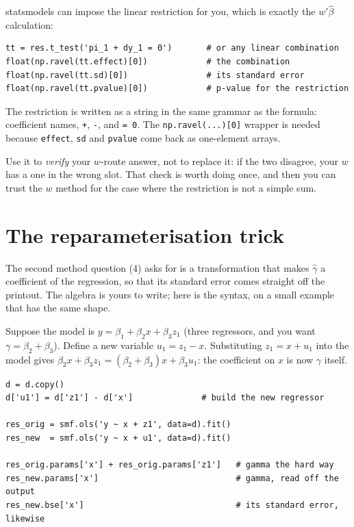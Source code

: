 \documentclass[11pt]{article}
\newcommand{\code}[1]{\texttt{#1}}
\begin{document}
statsmodels can impose the linear restriction for you, which is exactly the
$w'\hat\beta$ calculation:

\begin{lstlisting}
tt = res.t_test('pi_1 + dy_1 = 0')       # or any linear combination
float(np.ravel(tt.effect)[0])            # the combination
float(np.ravel(tt.sd)[0])                # its standard error
float(np.ravel(tt.pvalue)[0])            # p-value for the restriction
\end{lstlisting}

\noindent The restriction is written as a string in the same grammar as the
formula: coefficient names, \code{+}, \code{-}, and \code{= 0}. The
\code{np.ravel(...)[0]} wrapper is needed because \code{effect}, \code{sd} and
\code{pvalue} come back as one-element arrays.

\noindent Use it to \emph{verify} your $w$-route answer, not to replace it: if
the two disagree, your $w$ has a one in the wrong slot. That check is worth
doing once, and then you can trust the $w$ method for the case where the
restriction is not a simple sum.

\section{The reparameterisation trick}

The second method question (4) asks for is a transformation that makes
$\hat\gamma$ a coefficient of the regression, so that its standard error comes
straight off the printout. The algebra is yours to write; here is the syntax,
on a small example that has the same shape.

\noindent Suppose the model is $y = \beta_1 + \beta_2 x + \beta_3 z_1$ (three
regressors, and you want $\gamma = \beta_2 + \beta_3$). Define a new variable
$u_1 = z_1 - x$. Substituting $z_1 = x + u_1$ into the model gives
$\beta_2 x + \beta_3 z_1 = (\beta_2 + \beta_3)x + \beta_3 u_1$: the coefficient
on $x$ is now $\gamma$ itself.

\begin{lstlisting}
d = d.copy()
d['u1'] = d['z1'] - d['x']              # build the new regressor

res_orig = smf.ols('y ~ x + z1', data=d).fit()
res_new  = smf.ols('y ~ x + u1', data=d).fit()

res_orig.params['x'] + res_orig.params['z1']   # gamma the hard way
res_new.params['x']                            # gamma, read off the output
res_new.bse['x']                               # its standard error, likewise
\end{lstlisting}
\end{document}
